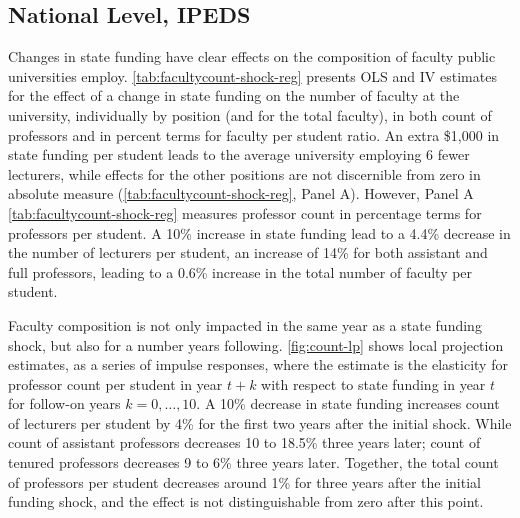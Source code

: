 \subsection{National Level, IPEDS}
Changes in state funding have clear effects on the composition of faculty public universities employ.
\autoref{tab:facultycount-shock-reg} presents OLS and IV estimates for the effect of a change in state funding on the number of faculty at the university, individually by position (and for the total faculty), in both count of professors and in percent terms for faculty per student ratio.
An extra \$1,000 in state funding per student leads to the average university employing 6 fewer lecturers, while effects for the other positions are not discernible from zero in absolute measure (\autoref{tab:facultycount-shock-reg}, Panel A).
However, Panel A \autoref{tab:facultycount-shock-reg} measures professor count in percentage terms for professors per student.
A 10\% increase in state funding lead to a 4.4\% decrease in the number of lecturers per student, an increase of 14\% for both assistant and full professors, leading to a 0.6\% increase in the total number of faculty per student.

Faculty composition is not only impacted in the same year as a state funding shock, but also for a number years following.
\autoref{fig:count-lp} shows local projection estimates, as a series of impulse responses, where the estimate is the elasticity for professor count per student in year $t+k$ with respect to state funding in year $t$ for follow-on years $k = 0, \hdots, 10$.
A 10\% decrease in state funding increases count of lecturers per student by 4\% for the first two years after the initial shock.
While count of assistant professors decreases 10 to 18.5\% three years later;
count of tenured professors decreases 9 to 6\% three years later.
Together, the total count of professors per student decreases around 1\% for three years after the initial funding shock, and the effect is not distinguishable from zero after this point.

